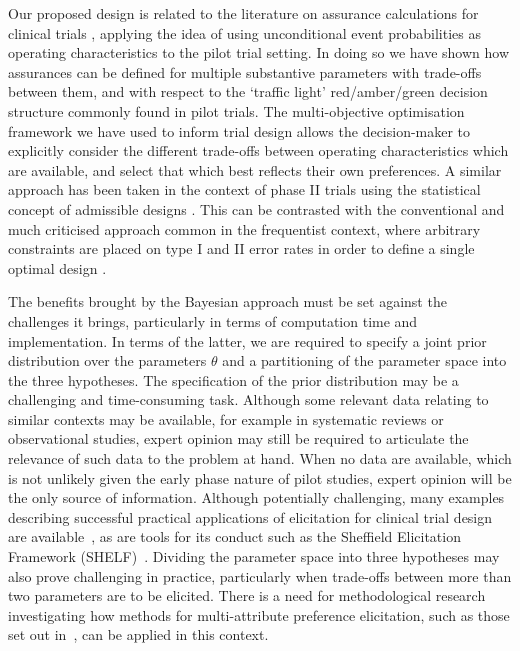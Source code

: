 \documentclass[AMA,STIX1COL]{WileyNJD-v2}
\begin{document}
Our proposed design is related to the literature on assurance calculations for clinical trials \cite{OHagan2005}, applying the idea of using unconditional event probabilities as operating characteristics to the pilot trial setting. In doing so we have shown how assurances can be defined for multiple substantive parameters with trade-offs between them, and with respect to the `traffic light' red/amber/green decision structure commonly found in pilot trials. The multi-objective optimisation framework we have used to inform trial design allows the decision-maker to explicitly consider the different trade-offs between operating characteristics which are available, and select that which best reflects their own preferences. A similar approach has been taken in the context of phase II trials using the statistical concept of admissible designs \cite{Jung2004, Mander2012}. This can be contrasted with the conventional and much criticised approach common in the frequentist context, where arbitrary constraints are placed on type I and II error rates in order to define a single optimal design \cite{Bacchetti2010}.

The benefits brought by the Bayesian approach must be set against the challenges it brings, particularly in terms of computation time and implementation. In terms of the latter, we are required to specify a joint prior distribution over the parameters $\theta$ and a partitioning of the parameter space into the three hypotheses. The specification of the prior distribution may be a challenging and time-consuming task. Although some relevant data relating to similar contexts may be available, for example in systematic reviews or observational studies, expert opinion may still be required to articulate the relevance of such data to the problem at hand. When no data are available, which is not unlikely given the early phase nature of pilot studies, expert opinion will be the only source of information. Although potentially challenging, many examples describing successful practical applications of elicitation for clinical trial design are available~\cite{Walley2015, Crisp2018, Dallow2018}, as are tools for its conduct such as the Sheffield Elicitation Framework (SHELF)~\cite{OHagan2006a}. Dividing the parameter space into three hypotheses may also prove challenging in practice, particularly when trade-offs between more than two parameters are to be elicited. There is a need for methodological research investigating how methods for multi-attribute preference elicitation, such as those set out in~\cite{Keeney1976}, can be applied in this context. 
\end{document}
